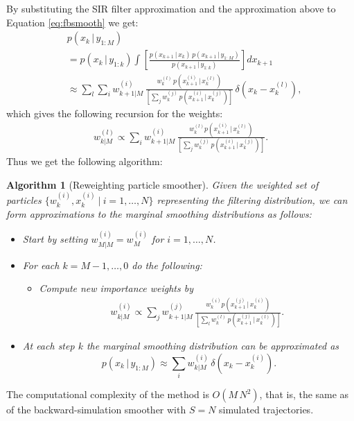 \documentclass[twocolumn]{autart}    %
\newtheorem{algo}{Algorithm}[section]
\begin{document}
%
By substituting the SIR filter approximation and the approximation
above to Equation \eqref{eq:fbsmooth} we get:
%
\begin{equation}
\begin{split}
  &p(x_k\,|\,y_{1:M}) \\
  &= p(x_k\,|\,y_{1:k})
     \int \left[ \frac{p(x_{k+1}\,|\,x_k)
                 \, p(x_{k+1}\,|\,y_{1:M})}
                 {p(x_{k+1}\,|\,y_{1:k})} \right]
         dx_{k+1} \\
  &\approx
  \sum_l 
  \sum_i w^{(i)}_{k+1|M} \,
  \frac{w_k^{(l)} \,  p(x_{k+1}^{(i)}\,|\,x_{k}^{(l)})}
   {\left[ \sum_j w_k^{(j)} \, p(x_{k+1}^{(i)}\,|\,x_{k}^{(j)}) \right]} \, \delta(x_k - x_{k}^{(l)}),
\end{split}
\label{eq:rw}
\end{equation}
%
which gives the following recursion for the weights:
%
\begin{equation}
\begin{split}
  w^{(l)}_{k|M} \propto
   \sum_i w^{(i)}_{k+1|M} \,
  \frac{w_k^{(l)} p(x_{k+1}^{(i)}\,|\,x_{k}^{(l)})}
   {\left[ \sum_j w_k^{(j)} \, p(x_{k+1}^{(i)}\,|\,x_{k}^{(j)}) \right]}.
\end{split}
\end{equation}
%
Thus we get the following algorithm:
%
\begin{algo}[Reweighting particle smoother]
  \label{alg:rwsmooth} 
  Given the weighted set of particles $\{ w_k^{(i)}, x_k^{(i)} ~|~
  i=1,\ldots,N \}$ representing the filtering distribution, we can
  form approximations to the marginal smoothing distributions as
  follows:
\begin{itemize}
\item Start by setting $w_{M|M}^{(i)} = w_M^{(i)}$ for $i=1,\ldots,N$.
\item For each $k=M-1,\ldots,0$ do the following:
  \begin{itemize}
  \item Compute new importance weights by
    \begin{equation}
      \begin{split}
        w^{(i)}_{k|M} \propto
        \sum_j w^{(j)}_{k+1|M} \,
        \frac{w_k^{(i)} p(x_{k+1}^{(j)}\,|\,x_{k}^{(i)})}
        {\left[ \sum_l w_k^{(l)} \, p(x_{k+1}^{(j)}\,|\,x_{k}^{(l)}) \right]}.
      \end{split}
    \end{equation}
  \end{itemize}
\item At each step $k$ the marginal smoothing distribution can be
  approximated as
 \begin{equation}
     p(x_k\,|\,y_{1:M})
     \approx \sum_i w_{k|M}^{(i)} \, \delta(x_k - x_k^{(i)}).
  \end{equation}
\end{itemize}
\end{algo}
%
The computational complexity of the method is $O(M\,N^2)$, that is,
the same as of the backward-simulation smoother with $S = N$ simulated
trajectories.
\end{document}

